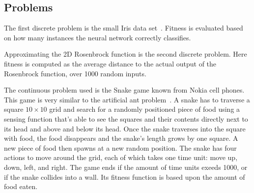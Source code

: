 \subsection{Problems}
The first discrete problem is the small Iris data set~\cite{Bache+Lichman:2013}. Fitness is evaluated based on how many instances the neural network correctly classifies.

Approximating the 2D Rosenbrock function is the second discrete problem. Here fitness is computed as the average distance to the actual output of the Rosenbrock function, over \num{1000} random inputs.

The continuous problem used is the Snake game known from Nokia cell phones. This game is very similar to the artificial ant problem~\cite[p.\ 147--155]{koza1992genetic}. A snake has to traverse a square $10\times 10$ grid and search for a randomly positioned piece of food using a sensing function that's able to see the squares and their contents directly next to its head and above and below its head. Once the snake traverses into the square with food, the food disappears and the snake's length grows by one square. A new piece of food then spawns at a new random position. The snake has four actions to move around the grid, each of which takes one time unit: move up, down, left, and right. The game ends if the amount of time units exeeds \num{1000}, or if the snake collides into a wall.  Its fitness function is based upon the amount of food eaten.

